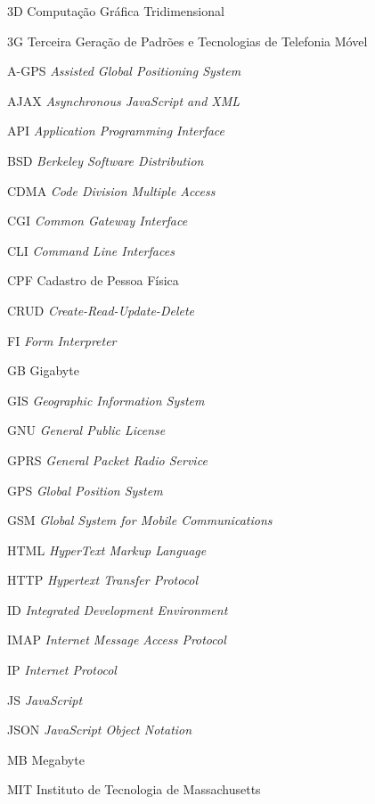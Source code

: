
\begin{siglas}
    \item[3D] Computação Gráfica Tridimensional
    \item[3G] Terceira Geração de Padrões e Tecnologias de Telefonia Móvel
    \item[A-GPS] \textit{Assisted Global Positioning System}
    \item[AJAX] \textit{Asynchronous JavaScript and XML}
    \item[API] \textit{Application Programming Interface}
    \item[BSD] \textit{Berkeley Software Distribution}
    \item[CDMA] \textit{Code Division Multiple Access}
    \item[CGI] \textit{Common Gateway Interface}
    \item[CLI] \textit{Command Line Interfaces}
    \item[CPF] Cadastro de Pessoa Física
    \item[CRUD] \textit{Create-Read-Update-Delete}
    \item[FI] \textit{Form Interpreter}
    \item[GB] Gigabyte
    \item[GIS] \textit{Geographic Information System}
    \item[GNU] \textit{General Public License}
    \item[GPRS] \textit{General Packet Radio Service}
    \item[GPS] \textit{Global Position System}
    \item[GSM] \textit{Global System for Mobile Communications}
    \item[HTML] \textit{HyperText Markup Language}
    \item[HTTP] \textit{Hypertext Transfer Protocol}
    \item[ID] \textit{Integrated Development Environment}
    \item[IMAP] \textit{Internet Message Access Protocol}
    \item[IP] \textit{Internet Protocol}
    \item[JS] \textit{JavaScript}
    \item[JSON] \textit{JavaScript Object Notation}
    \item[MB] Megabyte
    \item[MIT] Instituto de Tecnologia de Massachusetts

\end{siglas}
